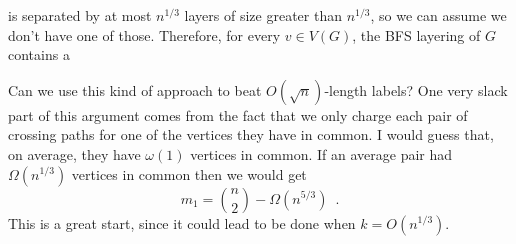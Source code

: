 \documentclass{patmorin}
\begin{document}
 is separated by at most $n^{1/3}$ layers of size greater than $n^{1/3}$, so we can assume we don't have one of those.  Therefore, for every $v\in V(G)$, the BFS layering of $G$ contains a


Can we use this kind of approach to beat $O(\sqrt{n})$-length labels?  One very slack part of this argument comes from the fact that we only charge each pair of crossing paths for one of the vertices they have in common. I would guess that, on average, they have $\omega(1)$ vertices in common.  If an average pair had $\Omega(n^{1/3})$ vertices in common then we would get
\[  m_1 = \binom{n}{2} - \Omega(n^{5/3}) \enspace . \]
This is a great start, since it could lead to be done when $k=O(n^{1/3})$.
















\end{document}
